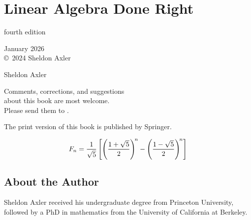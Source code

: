 
\setcounter{secnumdepth}{-1}


\setcounter{page}{0}

\chapter{Linear Algebra Done Right} \label{frontmatter}

\thispagestyle{empty}

\begin{center}

fourth edition

 January 2026
\\\copyright\ 2024 Sheldon Axler

\vfill

{\huge
Sheldon Axler}

\vfill

Comments, corrections, and suggestions\\about this book are most welcome.\\Please send them to .

\vfill

The print version of this book is published by Springer.

\bigskip

\end{center}

\CrCom


{

\[
F_n = \frac{1}{\sqrt{5}} \, \Biggl[ \paren[\Bigg]{ \frac{1 + \sqrt{5}}{2} }^{\!n}
-\paren[\Bigg]{ \frac{1 - \sqrt{5}}{2} }^{\!n} \Biggr]
\]}


\setcounter{page}{4}

\section{About the Author}\label{author}

Sheldon Axler received his undergraduate degree from Princeton University, followed by a PhD in mathematics from the University of California at Berkeley.


